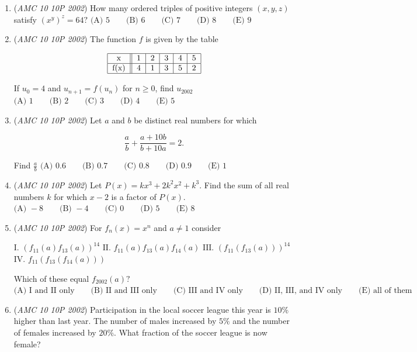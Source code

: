 \begin{enumerate}
 $\text{(A) }36 \qquad \text{(B) }38  \qquad \text{(C) }42 \qquad \text{(D) }44 \qquad \text{(E) }92$


	\item (\textit{AMC 10 10P 2002}) How many ordered triples of positive integers $(x,y,z)$ satisfy $(x^y)^z=64?$
$\text{(A) }5 \qquad \text{(B) }6 \qquad \text{(C) }7 \qquad \text{(D) }8 \qquad \text{(E) }9$


	\item (\textit{AMC 10 10P 2002}) The function $f$ is given by the table


 
 \[\begin{tabular}{|c||c|c|c|c|c|}  \hline   x & 1 & 2 & 3 & 4 & 5 \\   \hline  f(x) & 4 & 1 & 3 & 5 & 2 \\  \hline \end{tabular}\]


 If $u_0=4$ and $u_{n+1} = f(u_n)$ for $n \ge 0$, find $u_{2002}$
$\text{(A) }1 \qquad \text{(B) }2 \qquad \text{(C) }3 \qquad \text{(D) }4 \qquad \text{(E) }5$


	\item (\textit{AMC 10 10P 2002}) Let $a$ and $b$ be distinct real numbers for which

 \[\frac{a}{b} + \frac{a+10b}{b+10a} = 2.\]


 Find $\frac{a}{b}$
$\text{(A) }0.6 \qquad \text{(B) }0.7 \qquad \text{(C) }0.8 \qquad \text{(D) }0.9 \qquad \text{(E) }1$


	\item (\textit{AMC 10 10P 2002}) Let $P(x)=kx^3 + 2k^2x^2+k^3.$ Find the sum of all real numbers $k$ for which $x-2$ is a factor of $P(x).$
$\text{(A) }-8 \qquad \text{(B) }-4 \qquad \text{(C) }0 \qquad \text{(D) }5 \qquad \text{(E) }8$


	\item (\textit{AMC 10 10P 2002}) For $f_n(x)=x^n$ and $a \neq 1$ consider


 $\text{I. } (f_{11}(a)f_{13}(a))^{14}$
$\text{II. } f_{11}(a)f_{13}(a)f_{14}(a)$
$\text{III. } (f_{11}(f_{13}(a)))^{14}$
$\text{IV. } f_{11}(f_{13}(f_{14}(a)))$


 Which of these equal $f_{2002}(a)?$
$\text{(A) I and II only} \qquad \text{(B) II and III only} \qquad \text{(C) III and IV only} \qquad \text{(D) II, III, and IV only} \qquad \text{(E) all of them}$


	\item (\textit{AMC 10 10P 2002}) Participation in the local soccer league this year is $10\%$ higher than last year. The number of males increased by $5\%$ and the number of females increased by $20\%$. What fraction of the soccer league is now female?



\end{enumerate}
